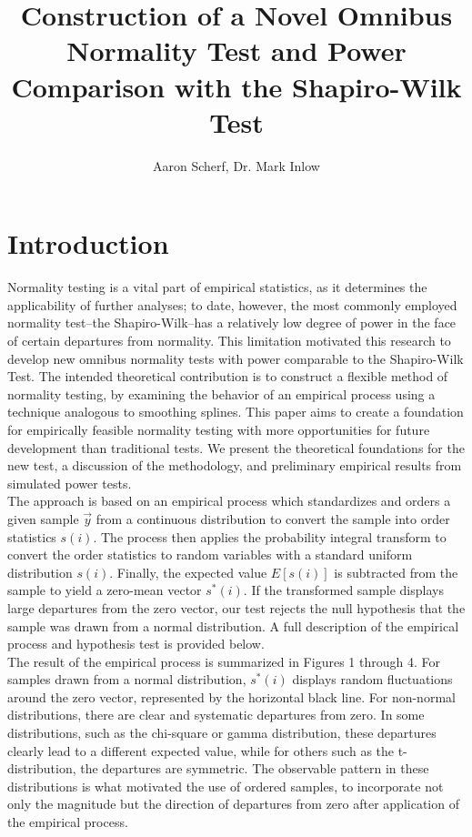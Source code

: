 \documentclass[12pt]{article}
\title{Construction of a Novel Omnibus Normality Test and Power Comparison with the Shapiro-Wilk Test}
\author[]{Aaron Scherf, Dr. Mark Inlow}
\begin{document}
    \maketitle

\section{Introduction}
Normality testing is a vital part of empirical statistics, as it determines the applicability of further analyses; to date, however, the most commonly employed normality test--the Shapiro-Wilk--has a relatively low degree of power in the face of certain departures from normality. This limitation motivated this research to develop new omnibus normality tests with power comparable to the Shapiro-Wilk Test. The intended theoretical contribution is to construct a flexible method of normality testing, by examining the behavior of an empirical process using a technique analogous to smoothing splines. This paper aims to create a foundation for empirically feasible normality testing with more opportunities for future development than traditional tests. We present the theoretical foundations for the new test, a discussion of the methodology, and preliminary empirical results from simulated power tests.\\

The approach is based on an empirical process which standardizes and orders a given sample $\vec{y}$ from a continuous distribution to convert the sample into order statistics $s(i)$. The process then applies the probability integral transform to convert the order statistics to random variables with a standard uniform distribution $s(i)$. Finally, the expected value $E[s(i)]$ is subtracted from the sample to yield a zero-mean vector $s^*(i)$. If the transformed sample displays large departures from the zero vector, our test rejects the null hypothesis that the sample was drawn from a normal distribution. A full description of the empirical process and hypothesis test is provided below.\\

The result of the empirical process  is summarized in Figures 1 through 4. For samples drawn from a normal distribution, $s^*(i)$ displays random fluctuations around the zero vector, represented by the horizontal black line. For non-normal distributions, there are clear and systematic departures from zero. In some distributions, such as the chi-square or gamma distribution, these departures clearly lead to a different expected value, while for others such as the t-distribution, the departures are symmetric. The observable pattern in these distributions is what motivated the use of ordered samples, to incorporate not only the magnitude but the direction of departures from zero after application of the empirical process. 
\end{document}
